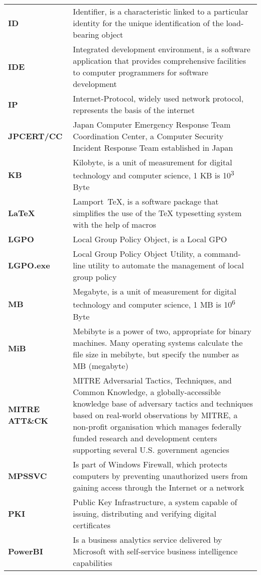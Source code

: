 \begin{longtable}{ p{4cm}  p{12cm} }
    \textbf{ID} & Identifier, is a characteristic linked to a particular identity for the unique identification of the load-bearing object\\
    \textbf{IDE} & Integrated development environment, is a software application that provides comprehensive facilities to computer programmers for software development\\
    \textbf{IP} & Internet-Protocol, widely used network protocol, represents the basis of the internet\\
    \textbf{JPCERT/CC} & Japan Computer Emergency Response Team Coordination Center, a Computer Security Incident Response Team established in Japan\\
    \textbf{KB} & Kilobyte,  is a unit of measurement for digital technology and computer science, 1 KB is 10\textsuperscript{3} Byte\\
    \textbf{LaTeX} & Lamport TeX, is a software package that simplifies the use of the TeX typesetting system with the help of macros\\
    \textbf{LGPO} & Local Group Policy Object, is a Local GPO\\
    \textbf{LGPO.exe} & Local Group Policy Object Utility, a command-line utility to automate the management of local group policy\\
    \textbf{MB} & Megabyte,  is a unit of measurement for digital technology and computer science, 1 MB is 10\textsuperscript{6} Byte\\
    \textbf{MiB} & Mebibyte is a power of two, appropriate for binary machines. Many operating systems calculate the file size in mebibyte, but specify the number as MB (megabyte)\\
    \textbf{MITRE ATT\&CK} & MITRE Adversarial Tactics, Techniques, and Common Knowledge, a globally-accessible knowledge base of adversary tactics and techniques based on real-world observations by MITRE, a non-profit organisation which manages federally funded research and development centers supporting several U.S. government agencies\\
    \textbf{MPSSVC} & Is part of Windows Firewall, which protects computers by preventing unauthorized users from gaining access through the Internet or a network\\
    \textbf{PKI} & Public Key Infrastructure,  a system capable of issuing, distributing and verifying digital certificates\\
    \textbf{PowerBI} & Is a business analytics service delivered by Microsoft with self-service business intelligence capabilities\\

\end{longtable}
